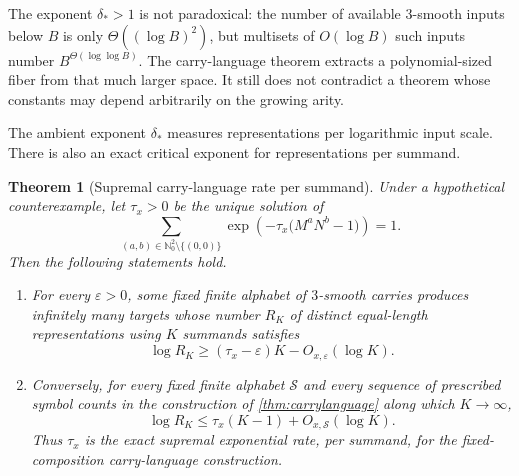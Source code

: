 \documentclass[11pt,oneside]{article}
\newtheorem{theorem}{Theorem}[section]
\theoremstyle{definition}
\newcommand{\N}{\mathbb{N}}
\begin{document}
\begin{roadblockbox}
The exponent $\delta_*>1$ is not paradoxical: the number of available $3$-smooth inputs below $B$ is only $\Theta((\log B)^2)$, but multisets of $O(\log B)$ such inputs number $B^{\Theta(\log\log B)}$.  The carry-language theorem extracts a polynomial-sized fiber from that much larger space.  It still does not contradict a theorem whose constants may depend arbitrarily on the growing arity.
\end{roadblockbox}

The ambient exponent $\delta_*$ measures representations per logarithmic input scale.  There is also an exact critical exponent for representations per summand.

\begin{theorem}[Supremal carry-language rate per summand]\label{thm:aritypressure}
Under a hypothetical counterexample, let $\tau_x>0$ be the unique solution of
\begin{equation}\label{eq:tau-infinite}
 \sum_{(a,b)\in\N_0^2\setminus\{(0,0)\}}
   \exp\!\left(-\tau_x\bigl(M^aN^b-1\bigr)\right)=1.
\end{equation}
Then the following statements hold.
\begin{enumerate}[label=\textup{(\roman*)}]
\item For every $\varepsilon>0$, some fixed finite alphabet of $3$-smooth carries produces infinitely many targets whose number $R_K$ of distinct equal-length representations using $K$ summands satisfies
\[
       \log R_K\ge (\tau_x-\varepsilon)K-O_{x,\varepsilon}(\log K).
\]
\item Conversely, for every fixed finite alphabet $\mathcal S$ and every sequence of prescribed symbol counts in the construction of \cref{thm:carrylanguage} along which $K\to\infty$,
\[
       \log R_K\le \tau_x(K-1)+O_{x,\mathcal S}(\log K).
\]
Thus $\tau_x$ is the exact supremal exponential rate, per summand, for the fixed-composition carry-language construction.
\end{enumerate}
\end{theorem}
\end{document}
